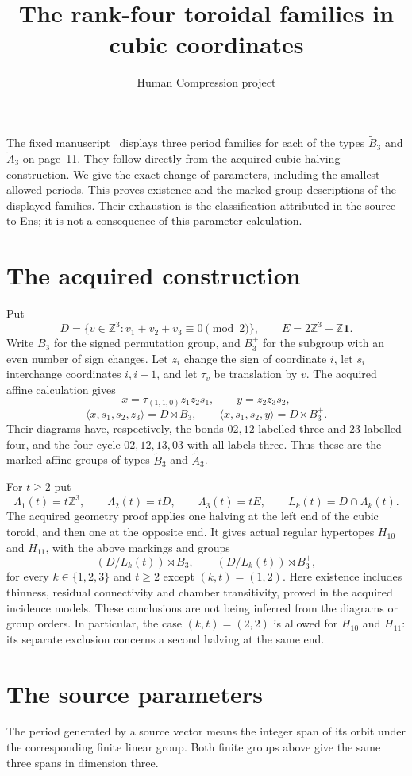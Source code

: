 \documentclass[11pt,a4paper]{article}
\title{The rank-four toroidal families in cubic coordinates}
\author{Human Compression project}
\date{}
\newcommand{\Z}{\mathbb Z}
\newcommand{\one}{\mathbf 1}
\begin{document}
\maketitle

The fixed manuscript~\cite{FLW} displays three period families for each
of the types $\widetilde B_3$ and $\widetilde A_3$ on page~11.
They follow directly from the acquired cubic halving construction.
We give the exact change of parameters, including the smallest allowed
periods. This proves existence and the marked group descriptions of the
displayed families. Their exhaustion is the classification attributed in
the source to Ens; it is not a consequence of this parameter calculation.

\section{The acquired construction}
Put
\[
 D=\{v\in\Z^3:v_1+v_2+v_3\equiv0\pmod2\},\qquad
 E=2\Z^3+\Z\one.
\]
Write $B_3$ for the signed permutation group, and $B_3^+$ for the
subgroup with an even number of sign changes. Let $z_i$ change the sign
of coordinate $i$, let $s_i$ interchange coordinates $i,i+1$, and let
$\tau_v$ be translation by $v$. The acquired affine calculation gives
\[
 x=\tau_{(1,1,0)}z_1z_2s_1,\qquad y=z_2z_3s_2,
\]
\[
 \langle x,s_1,s_2,z_3\rangle=D\rtimes B_3,\qquad
 \langle x,s_1,s_2,y\rangle=D\rtimes B_3^+.
\]
Their diagrams have, respectively, the bonds $02,12$ labelled three
and $23$ labelled four, and the four-cycle $02,12,13,03$ with all
labels three. Thus these are the marked affine groups of types
$\widetilde B_3$ and $\widetilde A_3$.

For $t\ge2$ put
\[
 \Lambda_1(t)=t\Z^3,\qquad \Lambda_2(t)=tD,\qquad
 \Lambda_3(t)=tE,\qquad L_k(t)=D\cap\Lambda_k(t).
\]
The acquired geometry proof applies one halving at the left end of the
cubic toroid, and then one at the opposite end. It gives actual regular
hypertopes $H_{10}$ and $H_{11}$, with the above markings and groups
\[
 (D/L_k(t))\rtimes B_3,\qquad
 (D/L_k(t))\rtimes B_3^+,
\]
for every $k\in\{1,2,3\}$ and $t\ge2$ except $(k,t)=(1,2)$.
Here existence includes thinness, residual connectivity and chamber
transitivity, proved in the acquired incidence models. These conclusions
are not being inferred from the diagrams or group orders. In particular,
the case $(k,t)=(2,2)$ is allowed for $H_{10}$ and $H_{11}$: its
separate exclusion concerns a second halving at the same end.

\section{The source parameters}
The period generated by a source vector means the integer span of its
orbit under the corresponding finite linear group. Both finite groups
above give the same three spans in dimension three.
\end{document}
